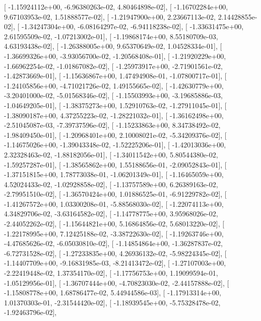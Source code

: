 \documentclass{article}
\begin{document}
       [ -1.15924112e+00,  -6.96380263e-02,   4.80464898e-02],
       [ -1.16702284e+00,   9.67103953e-02,   1.51888577e-02],
       [ -1.21947900e+00,   2.23667113e-02,   2.14428855e-02],
       [ -1.34247304e+00,  -6.08164297e-02,  -6.94118238e-02],
       [ -1.33631475e+00,   2.61595509e-02,  -1.07213002e-01],
       [ -1.19868174e+00,   8.55180709e-03,   4.63193438e-02],
       [ -1.26388005e+00,   9.65370649e-02,   1.04528334e-01],
       [ -1.36699326e+00,  -3.93056700e-02,  -1.20568408e-01],
       [ -1.21920229e+00,  -1.66962254e-02,  -1.01867082e-02],
       [ -1.25973917e+00,  -2.71901561e-02,  -1.42873669e-01],
       [ -1.15636867e+00,   1.47494908e-01,  -1.07800717e-01],
       [ -1.24105856e+00,  -4.71021726e-02,   1.49155665e-02],
       [ -1.42630779e+00,  -3.20401000e-02,  -5.01568346e-02],
       [ -1.15503993e+00,  -3.19685886e-03,  -1.04649205e-01],
       [ -1.38375273e+00,   1.52910763e-02,  -1.27911045e-01],
       [ -1.38090187e+00,   4.37255223e-02,  -1.28221032e-01],
       [ -1.36162498e+00,  -2.51045087e-03,  -7.39737596e-02],
       [ -1.15233863e+00,   8.34738492e-02,  -1.98409450e-01],
       [ -1.20968401e+00,   2.10008021e-02,  -5.34209376e-02],
       [ -1.14675026e+00,  -1.39043348e-02,  -1.52225206e-01],
       [ -1.42013036e+00,   2.32328463e-02,  -1.88182056e-01],
       [ -1.34011542e+00,   5.80544380e-02,  -1.59257287e-01],
       [ -1.38565862e+00,   1.55188656e-01,  -2.09052843e-01],
       [ -1.37151815e+00,   1.78773038e-01,  -1.06201349e-01],
       [ -1.16465059e+00,   4.52024433e-02,  -1.02928858e-02],
       [ -1.13757589e+00,   6.26389163e-02,  -2.79951510e-02],
       [ -1.36570424e+00,   1.01886525e-01,  -6.91229782e-02],
       [ -1.41267572e+00,   1.03300208e-01,  -5.88568030e-02],
       [ -1.22074113e+00,   4.34829706e-02,  -3.63164582e-02],
       [ -1.14778775e+00,   3.95968026e-02,  -2.44052262e-02],
       [ -1.15644821e+00,   5.16864856e-02,   5.68013220e-02],
       [ -1.22178995e+00,   7.12425188e-02,  -3.38722630e-02],
       [ -1.19263746e+00,  -4.47685626e-02,  -6.05030810e-02],
       [ -1.14854864e+00,  -1.36287837e-02,  -6.72731528e-02],
       [ -1.27233835e+00,   4.26936132e-02,  -5.98224345e-02],
       [ -1.14407709e+00,  -9.16831985e-03,  -8.21413472e-02],
       [ -1.27107003e+00,  -2.22419448e-02,   1.37354170e-02],
       [ -1.17756753e+00,   1.19099594e-01,  -1.05129956e-01],
       [ -1.36707444e+00,  -4.70823030e-02,  -2.44157888e-02],
       [ -1.15808778e+00,   1.68786477e-02,   5.44944586e-03],
       [ -1.17913314e+00,   1.01370303e-01,  -2.31544420e-02],
       [ -1.18939545e+00,  -5.75328478e-02,  -1.92463796e-02],
\end{document}
